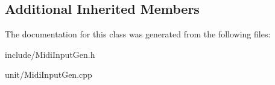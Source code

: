 \subsection*{Additional Inherited Members}


The documentation for this class was generated from the following files\+:\begin{DoxyCompactItemize}
\item 
include/Midi\+Input\+Gen.\+h\item 
unit/Midi\+Input\+Gen.\+cpp\end{DoxyCompactItemize}
